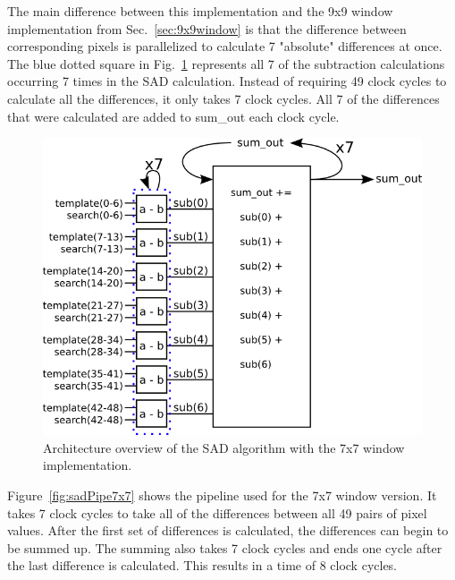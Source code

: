 The main difference between this implementation and the 9x9 window implementation from Sec.~\ref{sec:9x9window} is that the difference between corresponding pixels is parallelized to calculate 7 "absolute" differences at once. The blue dotted square in Fig.~\ref{fig:sadAlg7x7} represents all 7 of the subtraction calculations occurring 7 times in the SAD calculation. Instead of requiring 49 clock cycles to calculate all the differences, it only takes 7 clock cycles. All 7 of the differences that were calculated are added to sum\_out each clock cycle.

\begin{figure}[h]
	\begin{center}
		\includegraphics[width=120mm]{figures/sadAlgorithm7x7.png}
		\captionfonts
		\caption{Architecture overview of the SAD algorithm with the 7x7 window implementation.}
		\label{fig:sadAlg7x7}
	\end{center}
\end{figure}

Figure~\ref{fig:sadPipe7x7} shows the pipeline used for the 7x7 window version. It takes 7 clock cycles to take all of the differences between all 49 pairs of pixel values. After the first set of differences is calculated, the differences can begin to be summed up. The summing also takes 7 clock cycles and ends one cycle after the last difference is calculated. This results in a time of 8 clock cycles.

